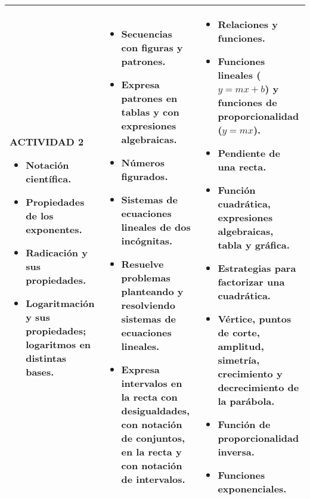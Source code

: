 \documentclass[12pt,a4paper]{article}
\begin{document}
\begin{center}
{{\begin{tabular}{|p{}|p{}|p{}|}
\textbf{ACTIVIDAD 2}
\begin{itemize}[leftmargin=*,topsep=0pt]
\item Notación científica.
\item Propiedades de los exponentes.
\item Radicación y sus propiedades.
\item Logaritmación y sus propiedades; logaritmos en distintas bases.
\end{itemize}
&
\begin{itemize}[leftmargin=*,topsep=0pt]
\item Secuencias con figuras y patrones.
\item Expresa patrones en tablas y con expresiones algebraicas.
\item Números figurados.
\item Sistemas de ecuaciones lineales de dos incógnitas.
\item Resuelve problemas planteando y resolviendo sistemas de ecuaciones lineales.
\item Expresa intervalos en la recta con desigualdades, con notación de conjuntos, en la recta y con notación de intervalos.
\end{itemize}
&
\begin{itemize}[leftmargin=*,topsep=0pt]
\item Relaciones y funciones.
\item Funciones lineales ($y=mx+b$) y funciones de proporcionalidad ($y=mx$).
\item Pendiente de una recta.
\item Función cuadrática, expresiones algebraicas, tabla y gráfica.
\item Estrategias para factorizar una cuadrática.
\item Vértice, puntos de corte, amplitud, simetría, crecimiento y decrecimiento de la parábola.
\item Función de proporcionalidad inversa.
\item Funciones exponenciales.
\end{itemize}
\\
\hline
\end{tabular}
}}
\end{center}

\vspace{0.5cm}
\end{document}
